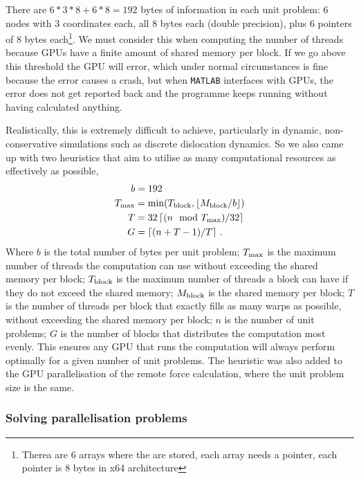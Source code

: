There are $6*3*8 + 6*8 = 192$ bytes of information in each unit problem: 6 nodes with 3 coordinates each, all 8 bytes each (double precision), plus 6 pointers of 8 bytes each\footnote{Therea are 6 arrays where the are stored, each array needs a pointer, each pointer is 8 bytes in x64 architecture}. We must consider this when computing the number of threads because GPUs have a finite amount of shared memory per block. If we go above this threshold the GPU will error, which under normal circumstances is fine because the error causes a crash, but when \texttt{MATLAB} interfaces with GPUs, the error does not get reported back and the programme keeps running without having calculated anything.

Realistically, this is extremely difficult to achieve, particularly in dynamic, non-conservative simulations such as discrete dislocation dynamics. So we also came up with two heuristics that aim to utilise as many computational resources as effectively as possible,
\begin{align}\label{eq:numThreads}
    b            & = 192                                                     \\
    T_{\textrm{max}} & = \min(T_{\textrm{block}}, \left\lfloor M_{\textrm{block}}/b \right\rfloor)  \\
    T            & = 32 \left\lceil (n \mod{T_{\textrm{max}}})/32 \right\rceil \\
    G            & = \left\lceil (n + T - 1) / T \right\rceil\,.
\end{align}
Where $b$ is the total number of bytes per unit problem; $T_{\textrm{max}}$ is the maximum number of threads the computation can use without exceeding the shared memory per block; $T_{\textrm{block}}$ is the maximum number of threads a block can have if they do not exceed the shared memory; $M_{\textrm{block}}$ is the shared memory per block; $T$ is the number of threads per block that exactly fills as many warps as possible, without exceeding the shared memory per block; $n$ is the number of unit problems; $G$ is the number of blocks that distributes the computation most evenly. This ensures any GPU that runs the computation will always perform optimally for a given number of unit problems. The heuristic was also added to the GPU parallelisation of the remote force calculation, where the unit problem size is the same.

\subsubsection{Solving parallelisation problems}

